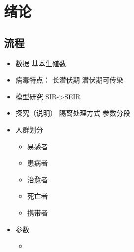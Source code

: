 \section{绪论}
\subsection{流程}
\begin{itemize}
	\item 数据
		\subitem 基本生殖数
	\item 病毒特点：
		\subitem 长潜伏期
		\subitem 潜伏期可传染
	\item 模型研究
		\subitem SIR->SEIR
	\item 探究（说明）
		\subitem 隔离处理方式
		\subitem 参数分段
	\item 人群划分
		\begin{itemize}
			\item 易感者
			\item 患病者
			\item 治愈者
			\item 死亡者
			\item 携带者
		\end{itemize}
	\item 参数
		\begin{itemize}
			\item 
		\end{itemize}
\end{itemize}